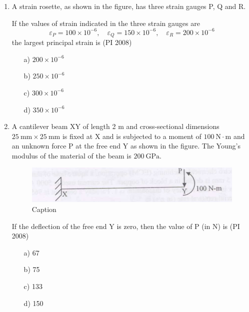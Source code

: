 \documentclass[journal,12pt,onecolumn]{IEEEtran}
\theoremstyle{remark}
\begin{document}
\begin{enumerate}
For a critical wear land of $1.8 \ \mathrm{mm}$, the cutting tool life (in minute) is  \hfill{(PI 2008)}
\begin{multicols}{4}
    \begin{enumerate}
\item[a)] 52.00
\item[b)] 51.67
\item[c)] 51.50
\item[d)] 50.00
\end{enumerate}
\end{multicols}
\vspace{1cm}
\item %
A strain rosette, as shown in the figure, has three strain gauges P, Q and R.  



If the values of strain indicated in the three strain gauges are  
\[
\varepsilon_P = 100 \times 10^{-6}, \quad
\varepsilon_Q = 150 \times 10^{-6}, \quad
\varepsilon_R = 200 \times 10^{-6}
\]
the largest principal strain is  \hfill{(PI 2008)}
\begin{multicols}{4}
    \begin{enumerate}
\item[a)] $200 \times 10^{-6}$
\item[b)] $250 \times 10^{-6}$
\item[c)] $300 \times 10^{-6}$
\item[d)] $350 \times 10^{-6}$
\end{enumerate}
\end{multicols}
\vspace{1cm}

\item %
A cantilever beam XY of length 2 m and cross-sectional dimensions $25\ \mathrm{mm} \times 25\ \mathrm{mm}$ is fixed at X and is subjected to a moment of $100\ \mathrm{N \cdot m}$ and an unknown force P at the free end Y as shown in the figure. The Young's modulus of the material of the beam is $200\ \mathrm{GPa}$.  

\begin{figure}[h]
    \centering
    \includegraphics[width=0.5\linewidth]{figures/GATE-pi-2008-55.png}
    \caption{Caption}
    \label{q55}
\end{figure}

If the deflection of the free end Y is zero, then the value of P (in N) is  \hfill{(PI 2008)}
\begin{multicols}{4}
    \begin{enumerate}
\item[a)] 67
\item[b)] 75
\item[c)] 133
\item[d)] 150
\end{enumerate}
\end{multicols}
\vspace{1cm}



\end{enumerate}
\end{document}
